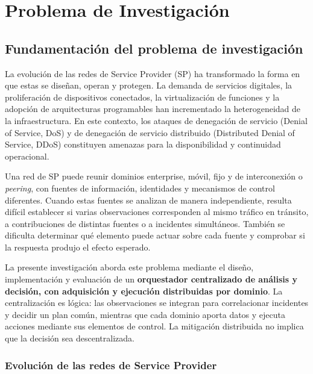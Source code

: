 \chapter{Problema de Investigación}

\section{Fundamentación del problema de investigación}

La evolución de las redes de Service Provider (SP) ha transformado la forma en que estas se diseñan, operan y protegen. La demanda de servicios digitales, la proliferación de dispositivos conectados, la virtualización de funciones y la adopción de arquitecturas programables han incrementado la heterogeneidad de la infraestructura. En este contexto, los ataques de denegación de servicio (Denial of Service, DoS) y de denegación de servicio distribuido (Distributed Denial of Service, DDoS) constituyen amenazas para la disponibilidad y continuidad operacional.

Una red de SP puede reunir dominios enterprise, móvil, fijo y de interconexión o \textit{peering}, con fuentes de información, identidades y mecanismos de control diferentes. Cuando estas fuentes se analizan de manera independiente, resulta difícil establecer si varias observaciones corresponden al mismo tráfico en tránsito, a contribuciones de distintas fuentes o a incidentes simultáneos. También se dificulta determinar qué elemento puede actuar sobre cada fuente y comprobar si la respuesta produjo el efecto esperado.

La presente investigación aborda este problema mediante el diseño, implementación y evaluación de un \textbf{orquestador centralizado de análisis y decisión, con adquisición y ejecución distribuidas por dominio}. La centralización es lógica: las observaciones se integran para correlacionar incidentes y decidir un plan común, mientras que cada dominio aporta datos y ejecuta acciones mediante sus elementos de control. La mitigación distribuida no implica que la decisión sea descentralizada.

\subsection{Evolución de las redes de Service Provider}

